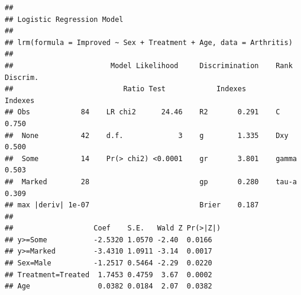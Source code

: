 \documentclass[11pt]{book}
\renewenvironment{knitrout}{\small\renewcommand{\baselinestretch}{.85}}{} %
\begin{document}
\begin{knitrout}
\color{fgcolor}\begin{kframe}
\begin{alltt}
 \hlkwb{<-}  \hlopt{~}  \hlopt{+}  \hlopt{+}  
\end{alltt}
\begin{verbatim}
## 
## Logistic Regression Model
## 
## lrm(formula = Improved ~ Sex + Treatment + Age, data = Arthritis)
## 
##                       Model Likelihood     Discrimination    Rank Discrim.    
##                          Ratio Test            Indexes          Indexes       
## Obs            84    LR chi2      24.46    R2       0.291    C       0.750    
##  None          42    d.f.             3    g        1.335    Dxy     0.500    
##  Some          14    Pr(> chi2) <0.0001    gr       3.801    gamma   0.503    
##  Marked        28                          gp       0.280    tau-a   0.309    
## max |deriv| 1e-07                          Brier    0.187                     
## 
##                   Coef    S.E.   Wald Z Pr(>|Z|)
## y>=Some           -2.5320 1.0570 -2.40  0.0166  
## y>=Marked         -3.4310 1.0911 -3.14  0.0017  
## Sex=Male          -1.2517 0.5464 -2.29  0.0220  
## Treatment=Treated  1.7453 0.4759  3.67  0.0002  
## Age                0.0382 0.0184  2.07  0.0382
\end{verbatim}
\end{kframe}
\end{knitrout}
\end{document}
